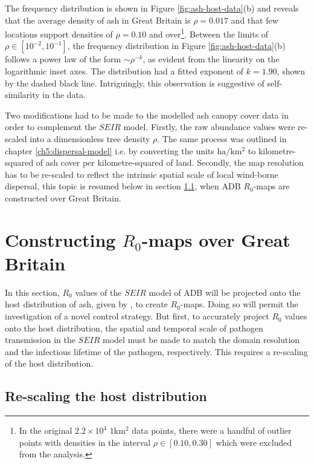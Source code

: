 The frequency distribution is shown in Figure \ref{fig:ash-host-data}(b) and reveals that the average density of ash in Great Britain is $\rho=0.017$ and that few locations support densities of $\rho=0.10$ and over\footnote{In the original $2.2\times 10^4$ $1\mathrm{km^2}$ data points, there were a handful of outlier points with densities in the interval $\rho \in [0.10, 0.30]$ which were excluded from the analysis.}. Between the limits of $\rho \in [10^{-2}, 10^{-1}]$, the frequency distribution in Figure \ref{fig:ash-host-data}(b) follows a power law of the form $\sim \rho ^{-k}$, as evident from the linearity on the logarithmic inset axes. The distribution had a fitted exponent of $k=1.90$, shown by the dashed black line. Intriguingly, this observation is suggestive of self-similarity in the data.

Two modifications had to be made to the modelled ash canopy cover data in order to complement the $SEIR$ model. Firstly, the raw abundance values were re-scaled into a dimensionless tree density $\rho$. The same process was outlined in chapter \ref{ch5:dispersal-model} i.e. by converting the units $\mathrm{ha/km^2}$ to kilometre-squared of ash cover per kilometre-squared of land. Secondly, the map resolution has to be re-scaled to reflect the intrinsic spatial scale of local wind-borne dispersal, this topic is resumed below in section \ref{ch6:re-scaling-host-data}, when ADB $R_0$-maps are constructed over Great Britain.

\section{Constructing $R_0$-maps over Great Britain}

In this section, $R_0$ values of the $SEIR$ model of ADB will be projected onto the host distribution of ash, given by \cite{hill.data}, to create $R_0$-maps. Doing so will permit the investigation of a novel control strategy. But first, to accurately project $R_0$ values onto the host distribution, the spatial and temporal scale of pathogen transmission in the $SEIR$ model must be made to match the domain resolution and the infectious lifetime of the pathogen, respectively. This requires a re-scaling of the host distribution.

\subsection{Re-scaling the host distribution}
\label{ch6:re-scaling-host-data}

